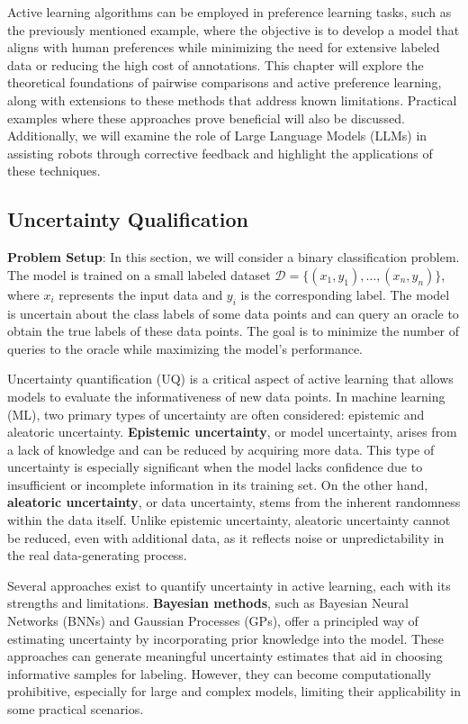 \documentclass[
  letterpaper,
  numbers=noenddot,
  DIV=11,
  oneside]{scrreprt}
\theoremstyle{remark}
\begin{document}
Active learning algorithms can be employed in preference learning tasks,
such as the previously mentioned example, where the objective is to
develop a model that aligns with human preferences while minimizing the
need for extensive labeled data or reducing the high cost of
annotations. This chapter will explore the theoretical foundations of
pairwise comparisons and active preference learning, along with
extensions to these methods that address known limitations. Practical
examples where these approaches prove beneficial will also be discussed.
Additionally, we will examine the role of Large Language Models (LLMs)
in assisting robots through corrective feedback and highlight the
applications of these techniques.

\subsection{Uncertainty Qualification}\label{uncertainty-qualification}

\textbf{Problem Setup}: In this section, we will consider a binary
classification problem. The model is trained on a small labeled dataset
\(\mathcal{D} = \{(x_1, y_1), \ldots, (x_n, y_n)\}\), where \(x_i\)
represents the input data and \(y_i\) is the corresponding label. The
model is uncertain about the class labels of some data points and can
query an oracle to obtain the true labels of these data points. The goal
is to minimize the number of queries to the oracle while maximizing the
model's performance.

Uncertainty quantification (UQ) is a critical aspect of active learning
that allows models to evaluate the informativeness of new data points.
In machine learning (ML), two primary types of uncertainty are often
considered: epistemic and aleatoric uncertainty. \textbf{Epistemic
uncertainty}, or model uncertainty, arises from a lack of knowledge and
can be reduced by acquiring more data. This type of uncertainty is
especially significant when the model lacks confidence due to
insufficient or incomplete information in its training set. On the other
hand, \textbf{aleatoric uncertainty}, or data uncertainty, stems from
the inherent randomness within the data itself. Unlike epistemic
uncertainty, aleatoric uncertainty cannot be reduced, even with
additional data, as it reflects noise or unpredictability in the real
data-generating process.

Several approaches exist to quantify uncertainty in active learning,
each with its strengths and limitations. \textbf{Bayesian methods}, such
as Bayesian Neural Networks (BNNs) and Gaussian Processes (GPs), offer a
principled way of estimating uncertainty by incorporating prior
knowledge into the model. These approaches can generate meaningful
uncertainty estimates that aid in choosing informative samples for
labeling. However, they can become computationally prohibitive,
especially for large and complex models, limiting their applicability in
some practical scenarios.
\end{document}
